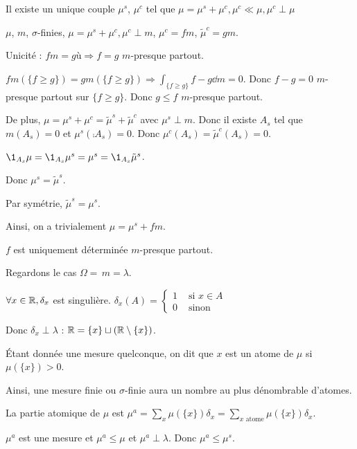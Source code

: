 \documentclass[10pt,a4paper,notitlepage ]{report}
\begin{document}
\begin{theorem}[Lebesgue]
	Il existe un unique couple $\mu^s$, $\mu^c$ tel que $\mu=\mu^s+\mu^c, \mu^c \ll \mu, \mu^c \perp \mu$
\end{theorem}

\begin{demo}
	$\mu$, $m$, $\sigma$-finies, $\mu=\mu^s + \mu^c, \mu^c \perp m$, $\mu^c = fm$, $\tilde\mu^c = gm$.
	
	Unicité : $fm=gù \Rightarrow f=g$ $m$-presque partout.
	
	$fm(\{f\ge g\})=gm(\{f\ge g\}) \Rightarrow \int_{\{f\ge g\}} f-g \dd m =0$.
	Donc $f-g=0$ $m$-presque partout sur $\{f\ge g\}$. Donc $g\le f$ $m$-presque partout.
	
	De plus, $\mu=\mu^s+\mu^c = \tilde\mu^s + \tilde\mu^c$ avec $\mu^s \perp m$. Donc il existe $A_s$ tel que $m(A_s)=0$ et $\mu^s(\comp{A_s}) = 0$. Donc $\mu^c(A_s) = \tilde\mu^c(A_s) = 0$.
	
	$\1_{A_s} \mu = \1_{A_s}\mu^s = \mu^s = \1_{A_s}\tilde\mu^s$.
	
	Donc $\mu^s = \tilde\mu^s$.
	
	Par symétrie, $\tilde\mu^s = \mu^s$.
\end{demo}

Ainsi, on a trivialement $\mu=\mu^s + fm$.

\begin{rem}
	$f$ est uniquement déterminée $m$-presque partout.
\end{rem}

Regardons le cas $\Omega = \, m = \lambda$.

$\forall x \in \mathbb R, \delta_x$ est singulière. $\delta_x(A) = \left\{\begin{aligned} 1 &\text{ si } x\in A \\ 0 &\text{ sinon} \end{aligned}\right.$

Donc $\delta_x \perp \lambda$ : $\mathbb R = \{x\} \sqcup (\mathbb R\setminus\{x\})$.

Étant donnée une mesure quelconque, on dit que $x$ est un atome de $\mu$ si $\mu(\{x\}) > 0$.

Ainsi, une mesure finie ou $\sigma$-finie aura un nombre au plus dénombrable d'atomes.

La partie atomique de $\mu$ est $\mu^a = \sum_x \mu(\{x\})\delta_x = \sum_{x \text{ atome}} \mu(\{x\})\delta_x$.

$\mu^a$ est une mesure et $\mu^a \le \mu$ et $\mu^a \perp \lambda$. Donc $\mu^a \le \mu^s$.
\end{document}
